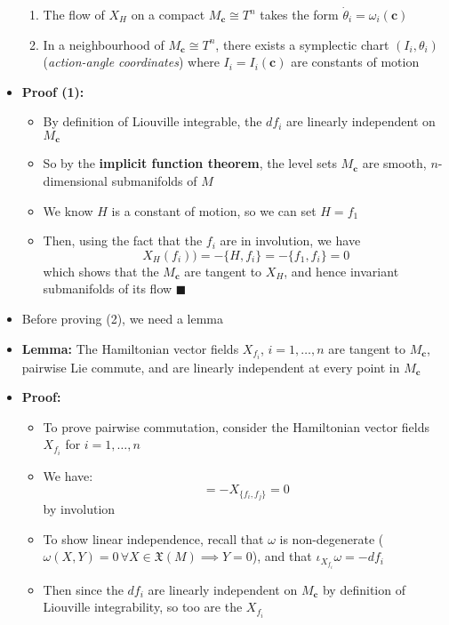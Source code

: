 \documentclass[12pt,a4paper]{article}
\numberwithin{equation}{section}
\begin{document}
\begin{itemize}
\begin{enumerate}
			\item The flow of $X_{H}$ on a compact $M_{\mathbf{c}}\cong T^{n}$ takes the form $\dot{\theta}_{i}=\omega_{i}(\mathbf{c})$
			\item In a neighbourhood of $M_{\mathbf{c}}\cong T^{n}$, there exists a symplectic chart $(I_{i},\theta_{i})$ (\textit{action-angle coordinates}) where $I_{i}=I_{i}(\mathbf{c})$ are constants  of motion
		\end{enumerate}
		\item \textbf{Proof (1):}
		\begin{itemize}
			\item By definition of Liouville integrable, the $df_{i}$ are linearly independent on $M_{\mathbf{c}}$
			\item So by the \textbf{implicit function theorem}, the level sets $M_{\mathbf{c}}$ are smooth, $n$-dimensional submanifolds of $M$
			\item We know $H$ is a constant of motion, so we can set $H=f_{1}$
			\item Then, using the fact that the $f_{i}$ are in involution, we have
			\begin{equation}
				X_{H}(f_{i}))=-\{H,f_{i}\}=-\{f_{1},f_{i}\}=0
			\end{equation}
			which shows that the $M_{\mathbf{c}}$ are tangent to $X_{H}$, and hence invariant submanifolds of its flow $\blacksquare$
		\end{itemize}
		\item Before proving (2), we need a lemma
		\item \textbf{Lemma:} The Hamiltonian vector fields $X_{f_{i}}$, $i=1,\ldots,n$ are tangent to $M_{\mathbf{c}}$, pairwise Lie commute, and are linearly independent at every point in $M_{\mathbf{c}}$
		\item \textbf{Proof:}
		\begin{itemize}
			\item To prove pairwise commutation, consider the Hamiltonian vector fields $X_{f_{i}}$ for $i=1,\ldots,n$
			\item We have:
			\begin{equation}
				[X_{f_{i}},X_{f_{j}}]=-X_{\{f_{i},f_{j}\}}=0
			\end{equation}
			by involution
			\item To show linear independence, recall that $\omega$ is non-degenerate ($\omega(X,Y)=0\,\forall X\in \mathfrak{X}(M)\implies Y=0$), and that $\iota_{X_{f_{i}}}\omega=-df_{i}$
			\item Then since the $df_{i}$ are linearly independent on $M_{\mathbf{c}}$ by definition of Liouville integrability, so too are the $X_{f_{i}}$

\end{itemize}
\end{itemize}
\end{document}

